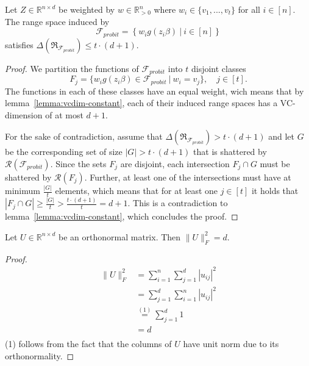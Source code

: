 \begin{lemma}
    Let $Z \in \mathbb{R}^{n \times d}$ be weighted by
    $w \in \mathbb{R}^n_{>0}$ where $w_i \in \{ v_1, ..., v_t \}$ for
    all $i \in [n]$.
    The range space induced by
    \begin{equation*}
        \mathcal{F}_{probit} = \left\{ w_ig(z_i\beta) \ |\ i \in [n] \right\}
    \end{equation*}
    satisfies
    $\Delta(\mathfrak{R}_{\mathcal{F}_{probit}}) \leq t \cdot (d + 1)$.
\end{lemma}
\begin{proof}
    We partition the functions of $\mathcal{F}_{probit}$ into $t$ disjoint
    classes
    \begin{equation*}
        F_j = \{ w_ig(z_i\beta) \in \mathcal{F}_{probit} \
        |\ w_i = v_j \},\quad j \in [t].
    \end{equation*}
    The functions in each of these classes have an equal
    weight, wich means that by lemma~\ref{lemma:vcdim-constant}, each of
    their induced range spaces has a VC-dimension of at most $d+1$.

    For the sake of contradiction, assume that
    $\Delta(\mathfrak{R}_{\mathcal{F}_{probit}}) > t \cdot (d + 1)$ and let
    $G$ be the corresponding set of size $|G| > t \cdot (d + 1)$ that
    is shattered by $\mathcal{R}(\mathcal{F}_{probit})$.
    Since the sets $F_j$ are disjoint, each intersection
    $F_j \cap G$ must be shattered by $\mathcal{R}(F_j)$.
    Further, at least one of the intersections must have at minimum
    $\frac{|G|}{t}$ elements, which means that for at least one $j \in [t]$
    it holds that
    $|F_j \cap G| \geq \frac{|G|}{t} > \frac{t \cdot (d+1)}{t} = d + 1$.
    This is a contradiction to lemma~\ref{lemma:vcdim-constant}, which
    concludes the proof.
\end{proof}




\begin{lemma}
    Let $U \in \mathbb{R}^{n \times d}$ be an orthonormal matrix.
    Then $\lVert U \rVert_F^2 = d$.
\end{lemma}
\begin{proof}
    \begin{align*}
        \lVert U \rVert_F^2
         & = \sum_{i=1}^n \sum_{j=1}^d |u_{ij}|^2 \\
         & = \sum_{j=1}^d \sum_{i=1}^n |u_{ij}|^2 \\
         & \overset{(1)}{=} \sum_{j=1}^d 1        \\
         & = d                                    \\
    \end{align*}
    (1) follows from the fact that the columns of $U$ have unit norm
    due to its orthonormality.
\end{proof}